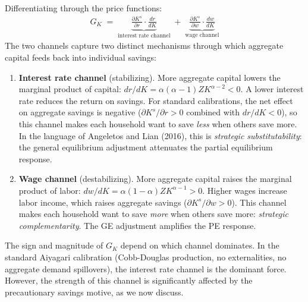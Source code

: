 \documentclass[12pt]{article}
\begin{document}
Differentiating through the price functions:
\begin{align}
    G_K \;=\; \underbrace{\frac{\partial K^s}{\partial r} \cdot \frac{dr}{dK}}_{\text{interest rate channel}} \;+\; \underbrace{\frac{\partial K^s}{\partial w} \cdot \frac{dw}{dK}}_{\text{wage channel}} \label{eq:G_K_decomposition}
\end{align}
The two channels capture two distinct mechanisms through which aggregate capital feeds back into individual savings:
\begin{enumerate}[nosep]
    \item \textbf{Interest rate channel} (stabilizing). More aggregate capital lowers the marginal product of capital: $dr/dK = \alpha(\alpha - 1) Z K^{\alpha - 2} < 0$. A lower interest rate reduces the return on savings. For standard calibrations, the net effect on aggregate savings is negative ($\partial K^s / \partial r > 0$ combined with $dr/dK < 0$), so this channel makes each household want to save \emph{less} when others save more. In the language of Angeletos and Lian (2016), this is \emph{strategic substitutability}: the general equilibrium adjustment attenuates the partial equilibrium response.

    \item \textbf{Wage channel} (destabilizing). More aggregate capital raises the marginal product of labor: $dw/dK = \alpha(1-\alpha)Z K^{\alpha-1} > 0$. Higher wages increase labor income, which raises aggregate savings ($\partial K^s / \partial w > 0$). This channel makes each household want to save \emph{more} when others save more: \emph{strategic complementarity}. The GE adjustment amplifies the PE response.
\end{enumerate}

\noindent The sign and magnitude of $G_K$ depend on which channel dominates. In the standard Aiyagari calibration (Cobb-Douglas production, no externalities, no aggregate demand spillovers), the interest rate channel is the dominant force. However, the strength of this channel is significantly affected by the precautionary savings motive, as we now discuss.
\end{document}
